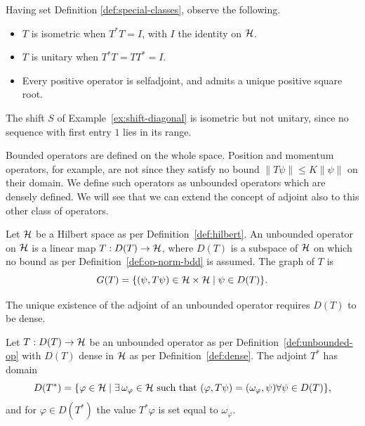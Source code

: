 \begin{remark}
	Having set Definition \ref{def:special-classes}, observe the following.
	\begin{itemize}
		\item $T$ is isometric when $T^{*}T=I$, with $I$ the identity on $\H$.
		\item $T$ is unitary when $T^{*}T=TT^{*}=I$.
		\item Every positive operator is selfadjoint, and admits a unique positive square root.
	\end{itemize}
	
\end{remark}

\begin{example}\label{ex:shift-not-unitary}
	The shift $S$ of Example~\ref{ex:shift-diagonal} is isometric but not unitary, since no sequence with first entry $1$ lies in its range.
\end{example}

Bounded operators are defined on the whole space. Position and momentum operators, for example, are not since they satisfy no bound $\|T\psi\|\leq K\|\psi\|$ on their domain. We define such operators as unbounded operators which are densely defined. We will see that we can extend the concept of adjoint also to this other class of operators.

\begin{definition}\label{def:unbounded-op}
	Let $\H$ be a Hilbert space as per Definition~\ref{def:hilbert}. An unbounded operator on $\H$ is a linear map $T: D(T)\to\H$, where $D(T)$ is a subspace of $\H$ on which no bound as per Definition~\ref{def:op-norm-bdd} is assumed. The graph of $T$ is
	\begin{equation}
		G(T)=\{(\psi,T\psi)\in\H\times\H\mid\psi\in D(T)\}.
	\end{equation}
\end{definition}

\noindent The unique existence of the adjoint of an unbounded operator requires $D(T)$ to be dense.

\begin{definition}\label{def:adjoint-unbdd}
	Let $T: D(T)\to\H$ be an unbounded operator as per Definition~\ref{def:unbounded-op} with $D(T)$ dense in $\H$ as per Definition~\ref{def:dense}. The adjoint $T^{*}$ has domain
	\begin{equation}
		D(T^{*})=\{\varphi\in\H\mid\exists\,\omega_\varphi\in\H\text{ such that }(\varphi,T\psi)=(\omega_\varphi,\psi) \forall \psi\in D(T)\},
	\end{equation}
	and for $\varphi\in D(T^{*})$ the value $T^{*}\varphi$ is set equal to $\omega_\varphi$.
\end{definition}

